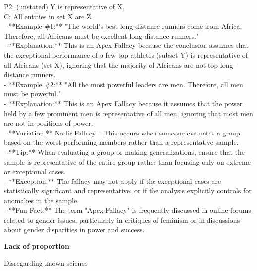 \documentclass[a4paper,12pt,single,pdftex]{scrbook}
\begin{document}
    
      P2: (unstated) Y is representative of X.
    \\

    
      C: All entities in set X are Z.
    \\

    
      - **Example \#1:** "The world's best long-distance runners come from Africa. Therefore, all Africans must be excellent long-distance runners."
    \\

    
      - **Explanation:** This is an Apex Fallacy because the conclusion assumes that the exceptional performance of a few top athletes (subset Y) is representative of all Africans (set X), ignoring that the majority of Africans are not top long-distance runners.
    \\

    
      - **Example \#2:** "All the most powerful leaders are men. Therefore, all men must be powerful."
    \\

    
      - **Explanation:** This is an Apex Fallacy because it assumes that the power held by a few prominent men is representative of all men, ignoring that most men are not in positions of power.
    \\

    
      - **Variation:** Nadir Fallacy – This occurs when someone evaluates a group based on the worst-performing members rather than a representative sample.
    \\

    
      - **Tip:** When evaluating a group or making generalizations, ensure that the sample is representative of the entire group rather than focusing only on extreme or exceptional cases.
    \\

    
      - **Exception:** The fallacy may not apply if the exceptional cases are statistically significant and representative, or if the analysis explicitly controls for anomalies in the sample.
    \\

    
      - **Fun Fact:** The term "Apex Fallacy" is frequently discussed in online forums related to gender issues, particularly in critiques of feminism or in discussions about gender disparities in power and success.
    \\

  \par \textbf{Lack of proportion}


Disregarding known science
\end{document}
